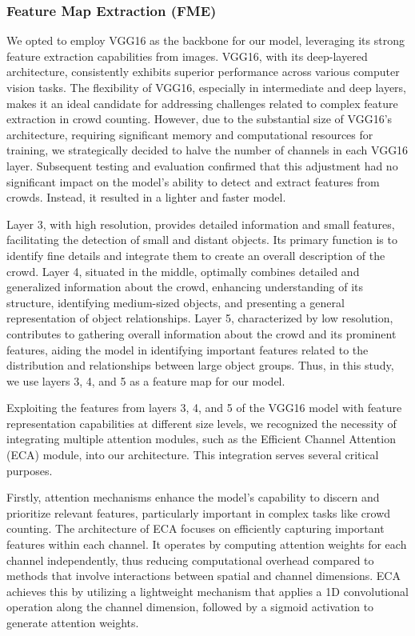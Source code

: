 \documentclass[journal]{IEEEtran}
\begin{document}
\subsubsection{\textbf{Feature Map Extraction (FME)}}
We opted to employ VGG16\cite{vgg16} as the backbone for our model, leveraging its strong feature extraction capabilities from images. VGG16, with its deep-layered architecture, consistently exhibits superior performance across various computer vision tasks. The flexibility of VGG16, especially in intermediate and deep layers, makes it an ideal candidate for addressing challenges related to complex feature extraction in crowd counting. However, due to the substantial size of VGG16's architecture, requiring significant memory and computational resources for training, we strategically decided to halve the number of channels in each VGG16 layer. Subsequent testing and evaluation confirmed that this adjustment had no significant impact on the model's ability to detect and extract features from crowds. Instead, it resulted in a lighter and faster model.

Layer 3, with high resolution, provides detailed information and small features, facilitating the detection of small and distant objects. Its primary function is to identify fine details and integrate them to create an overall description of the crowd. Layer 4, situated in the middle, optimally combines detailed and generalized information about the crowd, enhancing understanding of its structure, identifying medium-sized objects, and presenting a general representation of object relationships. Layer 5, characterized by low resolution, contributes to gathering overall information about the crowd and its prominent features, aiding the model in identifying important features related to the distribution and relationships between large object groups. Thus, in this study, we use layers 3, 4, and 5 as a feature map for our model.

Exploiting the features from layers 3, 4, and 5 of the VGG16 model with feature representation capabilities at different size levels, we recognized the necessity of integrating multiple attention modules, such as the Efficient Channel Attention (ECA) module, into our architecture. This integration serves several critical purposes.

Firstly, attention mechanisms enhance the model's capability to discern and prioritize relevant features, particularly important in complex tasks like crowd counting. The architecture of ECA focuses on efficiently capturing important features within each channel. It operates by computing attention weights for each channel independently, thus reducing computational overhead compared to methods that involve interactions between spatial and channel dimensions. ECA achieves this by utilizing a lightweight mechanism that applies a 1D convolutional operation along the channel dimension, followed by a sigmoid activation to generate attention weights.
\end{document}
